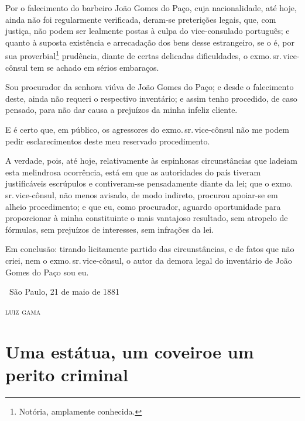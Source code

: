 {Por o falecimento do barbeiro João Gomes do Paço, cuja nacionalidade,
até hoje, ainda não foi regularmente verificada, deram-se preterições
legais, que, com justiça, não podem ser lealmente postas à culpa do
vice-consulado português; e quanto à suposta existência e arrecadação
dos bens desse estrangeiro, se o é, por sua proverbial\footnote{
  Notória, amplamente conhecida.}
prudência, diante de certas
delicadas dificuldades, o exmo.\,sr.\,vice-cônsul tem se achado em sérios
embaraços.

Sou procurador da senhora viúva de João Gomes do Paço; e desde o
falecimento deste, ainda não requeri o respectivo inventário; e assim
tenho procedido, de caso pensado, para não dar causa a prejuízos da
minha infeliz cliente.

E é certo que, em público, os agressores do exmo.\,sr.\,vice-cônsul não me
podem pedir esclarecimentos deste meu reservado procedimento.

A verdade, pois, até hoje, relativamente às espinhosas circunstâncias
que ladeiam esta melindrosa ocorrência, está em que as autoridades do
país tiveram justificáveis escrúpulos e contiveram-se pensadamente
diante da lei; que o exmo.\,sr.\,vice-cônsul, não menos avisado, de modo
indireto, procurou apoiar-se em alheio procedimento; e que eu, como
procurador, aguardo oportunidade para proporcionar à minha constituinte
o mais vantajoso resultado, sem atropelo de fórmulas, sem prejuízos de
interesses, sem infrações da lei.

Em conclusão: tirando licitamente partido das circunstâncias, e de fatos
que não criei, nem o exmo.\,sr.\,vice-cônsul, o autor da demora legal do
inventário de João Gomes do Paço sou eu.

\medskip

\hfill\ São Paulo, 21 de maio de 1881

\hfill\textsc{luiz gama}

\part[Uma estátua, um coveiro e um perito criminal]{Uma estátua, um coveiro\break e um perito criminal}

}
